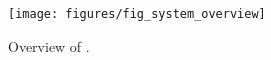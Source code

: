 \begin{figure}[t]
    \centering
    \texttt{[image: figures/fig\_system\_overview]}
    \caption{Overview of \Hammer.}
    \label{fig:fig_system_overview}
\end{figure}


%
%
%
%
%

